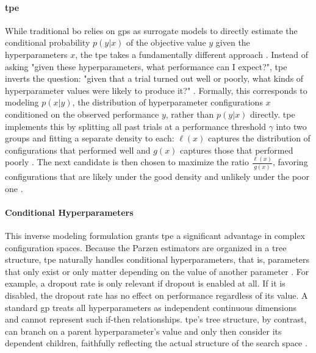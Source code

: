\paragraph{\gls{tpe}}
While traditional \gls{bo} relies on \glspl{gp} as surrogate models to directly estimate the conditional probability $p(y|x)$ of the objective value $y$ given the hyperparameters $x$, the \gls{tpe} takes a fundamentally different approach \parencite{bergstraAlgorithmsHyperParameterOptimization2011}. Instead of asking "given these hyperparameters, what performance can I expect?", \gls{tpe} inverts the question: "given that a trial turned out well or poorly, what kinds of hyperparameter values were likely to produce it?" \parencite{bergstraAlgorithmsHyperParameterOptimization2011}. Formally, this corresponds to modeling $p(x|y)$, the distribution of hyperparameter configurations $x$ conditioned on the observed performance $y$, rather than $p(y|x)$ directly. \gls{tpe} implements this by splitting all past trials at a performance threshold $\gamma$ into two groups and fitting a separate density to each: $\ell(x)$ captures the distribution of configurations that performed well and $g(x)$ captures those that performed poorly \parencite{bergstraAlgorithmsHyperParameterOptimization2011, yangHyperparameterOptimizationMachine2020}. The next candidate is then chosen to maximize the ratio $\frac{\ell(x)}{g(x)}$, favoring configurations that are likely under the good density and unlikely under the poor one \parencite{bergstraAlgorithmsHyperParameterOptimization2011}.

\paragraph{Conditional Hyperparameters}
This inverse modeling formulation grants \gls{tpe} a significant advantage in complex configuration spaces. Because the Parzen estimators are organized in a tree structure, \gls{tpe} naturally handles conditional hyperparameters, that is, parameters that only exist or only matter depending on the value of another parameter \parencite{yangHyperparameterOptimizationMachine2020}. For example, a dropout rate is only relevant if dropout is enabled at all. If it is disabled, the dropout rate has no effect on performance regardless of its value. A standard \gls{gp} treats all hyperparameters as independent continuous dimensions and cannot represent such if-then relationships. \gls{tpe}'s tree structure, by contrast, can branch on a parent hyperparameter's value and only then consider its dependent children, faithfully reflecting the actual structure of the search space \parencite{bergstraAlgorithmsHyperParameterOptimization2011, yangHyperparameterOptimizationMachine2020}.

